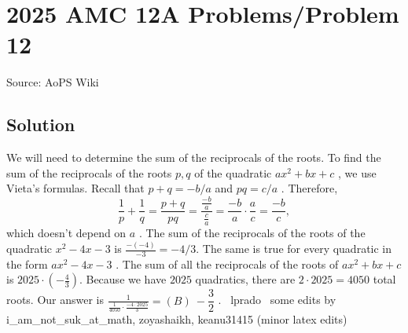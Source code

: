 \documentclass[12pt]{article}
\begin{document}
\section*{{2025 AMC 12A Problems/Problem 12}}
Source: AoPS Wiki

\subsection*{Solution}
We will need to determine the sum of the reciprocals of the roots. To find the sum of the reciprocals of the roots $p,q$ of the quadratic $ax^2+bx+c$ , we use Vieta's formulas. Recall that $p+q = -b/a$ and $pq = c/a$ . Therefore, \[\frac{1}{p} + \frac{1}{q} = \frac{p+q}{pq} = \frac{\frac{-b}{a}}{\frac{c}{a}} = \frac{-b}{a} \cdot \frac{a}{c} = \frac{-b}{c},\] which doesn't depend on $a$ . The sum of the reciprocals of the roots of the quadratic $x^2-4x-3$ is $\frac{-(-4)}{-3} = -4/3.$ The same is true for every quadratic in the form $ax^2-4x-3$ . The sum of all the reciprocals of the roots of $ax^2+bx+c$ is $2025 \cdot \left(-\frac{4}{3}\right).$ Because we have $2025$ quadratics, there are $2 \cdot 2025 = 4050$ total roots. Our answer is $\frac{1}{\frac{1}{4050}\cdot \frac{-4\cdot 2025}{3}} =\boxed{(B)\ -\dfrac{3}{2}}$ . ~lprado ~some edits by i_am_not_suk_at_math, zoyashaikh, keanu31415 (minor latex edits)
\end{document}
